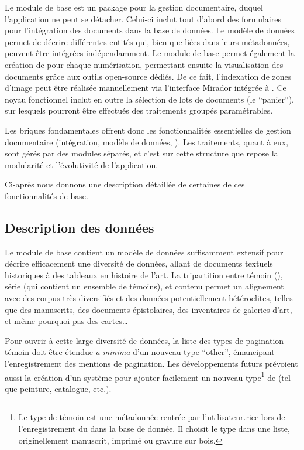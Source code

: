Le module de base est un package pour la gestion documentaire, duquel
l'application ne peut se détacher. Celui-ci inclut tout d'abord des
formulaires pour l'intégration des documents dans la base de données. Le
modèle de données permet de décrire différentes entités qui, bien que
liées dans leurs métadonnées, peuvent être intégrées indépendamment. Le
module de base permet également la création de \mans \iiif pour
chaque numérisation, permettant ensuite la visualisation des documents
grâce aux outils open-source dédiés. De ce fait, l'indexation de zones
d'image peut être réalisée manuellement via l'interface Mirador intégrée
à \sas. Ce noyau fonctionnel inclut en outre la sélection de lots de
documents (le ``panier''), sur lesquels pourront être effectués des
traitements groupés paramétrables.

Les briques fondamentales offrent donc les fonctionnalités essentielles
de gestion documentaire (intégration, modèle de données, \iiif). Les
traitements, quant à eux, sont gérés par des modules séparés, et c'est
sur cette structure que repose la modularité et l'évolutivité de
l'application.

Ci-après nous donnons une description détaillée de certaines de ces
fonctionnalités de base.

\hypertarget{description-des-donnees}{%
\subsection{Description des
données}\label{description-des-donnees}}

Le module de base contient un modèle de données suffisamment extensif
pour décrire efficacement une diversité de données, allant de documents
textuels historiques à des tableaux en histoire de l'art. La
tripartition entre témoin (\wit), série (qui contient un ensemble de
témoins), et contenu permet un alignement avec des corpus très
diversifiés et des données potentiellement hétéroclites, telles que des
manuscrits, des documents épistolaires, des inventaires de galeries
d'art, et même pourquoi pas des cartes\ldots{}

Pour ouvrir à cette large diversité de données, la liste des types de
pagination témoin doit être étendue \emph{a minima} d'un nouveau type
``other'', émancipant l'enregistrement des mentions de pagination. Les
développements futurs prévoient aussi la création d'un système pour
ajouter facilement un nouveau type\footnote{Le type de témoin est une
  métadonnée rentrée par l'utilisateur.rice lors de l'enregistrement du
  \wit dans la base de donnée. Il choisit le type dans une liste,
  originellement manuscrit, imprimé ou gravure sur bois.} de \wit
(tel que peinture, catalogue, etc.).

